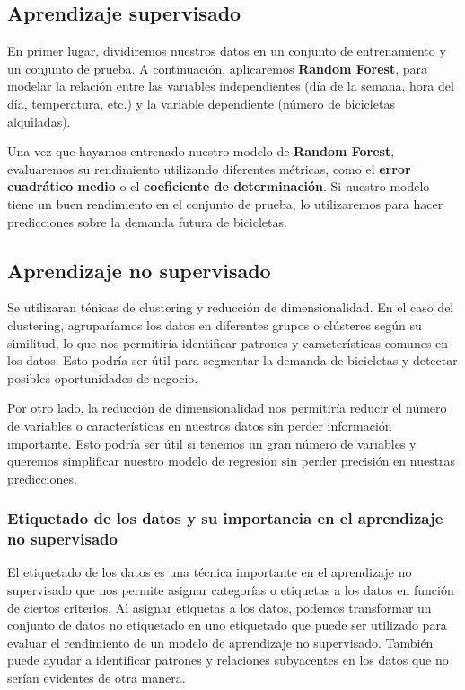 \documentclass{wsdcr}
\begin{document}
\subsection{Aprendizaje supervisado}
En primer lugar, dividiremos nuestros datos en un conjunto de entrenamiento y un conjunto de prueba. A continuación, aplicaremos \textbf{Random Forest}, para modelar la relación entre las variables independientes (día de la semana, hora del día, temperatura, etc.) y la variable dependiente (número de bicicletas alquiladas).

Una vez que hayamos entrenado nuestro modelo de \textbf{Random Forest}, evaluaremos su rendimiento utilizando diferentes métricas, como el \textbf{error cuadrático medio} o el \textbf{coeficiente de determinación}. Si nuestro modelo tiene un buen rendimiento en el conjunto de prueba, lo utilizaremos para hacer predicciones sobre la demanda futura de bicicletas.
\subsection{Aprendizaje no supervisado}
Se utilizaran ténicas de clustering y reducción de dimensionalidad.
En el caso del clustering, agruparíamos los datos en diferentes grupos o clústeres según su similitud, lo que nos permitiría identificar patrones y características comunes en los datos. Esto podría ser útil para segmentar la demanda de bicicletas y detectar posibles oportunidades de negocio.

Por otro lado, la reducción de dimensionalidad nos permitiría reducir el número de variables o características en nuestros datos sin perder información importante. Esto podría ser útil si tenemos un gran número de variables y queremos simplificar nuestro modelo de regresión sin perder precisión en nuestras predicciones.
\subsubsection{Etiquetado de los datos y su importancia en el aprendizaje no supervisado}

El etiquetado de los datos es una técnica importante en el aprendizaje no supervisado que nos permite asignar categorías o etiquetas a los datos en función de ciertos criterios. Al asignar etiquetas a los datos, podemos transformar un conjunto de datos no etiquetado en uno etiquetado que puede ser utilizado para evaluar el rendimiento de un modelo de aprendizaje no supervisado. También puede ayudar a identificar patrones y relaciones subyacentes en los datos que no serían evidentes de otra manera.
\end{document}

